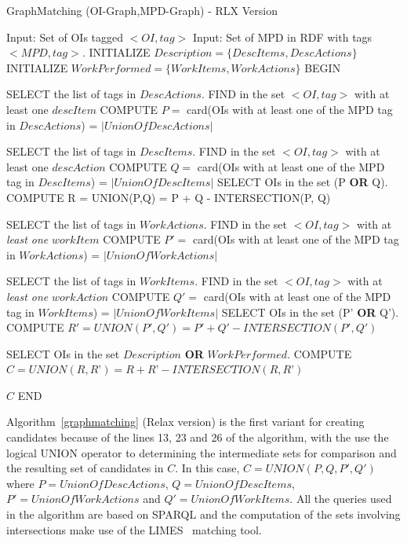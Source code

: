 \documentclass[runningheads,a4paper]{{llncs}}
\begin{document}
\begin{algorithm}[h]\scriptsize
 \caption{GraphMatching (OI-Graph,MPD-Graph) - RLX Version}
\label{graphmatching}
\begin{algorithmic}[1]
\STATE Input: Set of OIs tagged  $<OI, tag>$ 
\STATE Input: Set of MPD in RDF with tags  $<MPD, tag>$.
\STATE INITIALIZE $Description = \{DescItems, DescActions\}$
\STATE INITIALIZE $WorkPerformed = \{WorkItems, WorkActions\} $
\STATE BEGIN
		
		\STATE SELECT the list of tags in $DescActions$.
		\STATE FIND in the set $<OI, tag>$ with at least one $descItem$
		\STATE COMPUTE $P =$ card(OIs with at least one of the MPD tag in $DescActions$) = $|UnionOfDescActions|$
         		 
		\STATE SELECT the list of tags in $DescItems$.
	    \STATE FIND in the set $<OI, tag>$ with at least one $descAction$
		\STATE COMPUTE $Q =$ card(OIs with at least one of the MPD tag in $DescItems$) = $|UnionOfDescItems|$
		\STATE SELECT OIs in the set (P \textbf{OR} Q).
	    \STATE COMPUTE R = UNION(P,Q) = P + Q - INTERSECTION(P, Q) 
 	
 \ENDFOR	    		
	
		
		\STATE SELECT the list of tags in $WorkActions$.
		\STATE FIND in the set $<OI, tag>$ with at \textit{least one} $workItem$
		\STATE COMPUTE $P' =$ card(OIs with at least one of the MPD tag in $WorkActions$) = $|UnionOfWorkActions|$
         		 
		\STATE SELECT the list of tags in $WorkItems$.
	    \STATE FIND in the set $<OI, tag>$ with at \textit{least one} $workAction$
		\STATE COMPUTE $Q' =$ card(OIs with at least one of the MPD tag in $WorkItems$) = $|UnionOfWorkItems|$
		\STATE SELECT OIs in the set (P' \textbf{OR} Q').
	    \STATE COMPUTE $R' = UNION(P',Q') = P' + Q' - INTERSECTION(P', Q') $
 	
 \ENDFOR	  
 
  \STATE SELECT OIs in the set $Description$ \textbf{OR} $WorkPerformed$.	
   \STATE COMPUTE $C =UNION(R, R’) = R + R’ - INTERSECTION (R, R’) $


    \RETURN $C$
  \STATE END
\end{algorithmic}
\end{algorithm}
 
Algorithm~\ref{graphmatching} (Relax version) is the first variant for creating candidates because of the lines 13, 23 and 26 of the algorithm, with the use the logical UNION operator to determining the intermediate sets for comparison and the resulting set of candidates in $C$. In this case, $C = UNION(P,Q,P',Q')$ where $P = UnionOfDescActions$, $Q = UnionOfDescItems$, $P' = UnionOfWorkActions$ and $Q' = UnionOfWorkItems$. All the queries used in the algorithm are based on SPARQL and the computation of the sets involving intersections make use of the LIMES~\cite{ngonga11} matching tool.  
\end{document}
